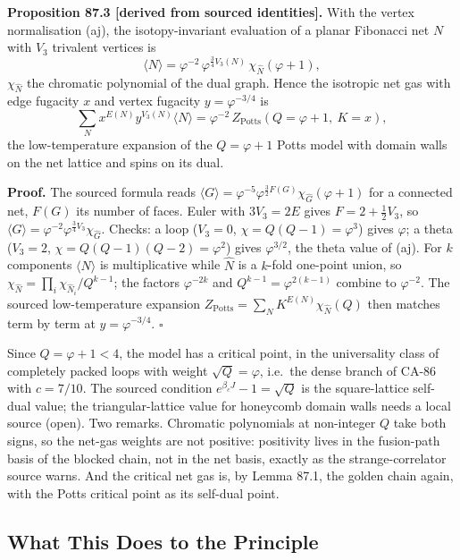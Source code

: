 \textbf{Proposition 87.3 [derived from sourced identities].}  With the
vertex normalisation (aj), the isotopy-invariant evaluation of a planar
Fibonacci net \(N\) with \(V_3\) trivalent vertices is
\[
  \langle N\rangle=\varphi^{-2}\,\varphi^{\frac34V_3(N)}\,\chi_{\widehat N}(\varphi+1),
\]
\(\chi_{\widehat N}\) the chromatic polynomial of the dual graph.  Hence the
isotropic net gas with edge fugacity \(x\) and vertex fugacity
\(y=\varphi^{-3/4}\) is
\[
  \sum_N x^{E(N)}y^{V_3(N)}\langle N\rangle=\varphi^{-2}\,Z_{\mathrm{Potts}}(Q=\varphi+1,\ K=x),
\]
the low-temperature expansion of the \(Q=\varphi+1\) Potts model with domain
walls on the net lattice and spins on its dual.

\textbf{Proof.}  The sourced formula reads \(\langle G\rangle=\varphi^{-5}\varphi^{\frac32F(G)}\chi_{\widehat G}(\varphi+1)\)
for a connected net, \(F(G)\) its number of faces.  Euler with \(3V_3=2E\)
gives \(F=2+\tfrac12V_3\), so \(\langle G\rangle=\varphi^{-2}\varphi^{\frac34V_3}\chi_{\widehat G}\).
Checks: a loop (\(V_3=0\), \(\chi=Q(Q-1)=\varphi^3\)) gives \(\varphi\); a
theta (\(V_3=2\), \(\chi=Q(Q-1)(Q-2)=\varphi^2\)) gives \(\varphi^{3/2}\),
the theta value of (aj).  For \(k\) components \(\langle N\rangle\) is
multiplicative while \(\widehat N\) is a \(k\)-fold one-point union, so
\(\chi_{\widehat N}=\prod_i\chi_{\widehat N_i}/Q^{k-1}\); the factors
\(\varphi^{-2k}\) and \(Q^{k-1}=\varphi^{2(k-1)}\) combine to \(\varphi^{-2}\).
The sourced low-temperature expansion \(Z_{\mathrm{Potts}}=\sum_NK^{E(N)}\chi_{\widehat N}(Q)\)
then matches term by term at \(y=\varphi^{-3/4}\).  \(\square\)

Since \(Q=\varphi+1<4\), the model has a critical point, in the universality
class of completely packed loops with weight \(\sqrt Q=\varphi\), i.e.\ the
dense branch of CA-86 with \(c=7/10\).  The sourced condition
\(e^{\beta_cJ}-1=\sqrt Q\) is the square-lattice self-dual value; the
triangular-lattice value for honeycomb domain walls needs a local source
(open).  Two remarks.  Chromatic polynomials at non-integer \(Q\) take both
signs, so the net-gas weights are not positive: positivity lives in the
fusion-path basis of the blocked chain, not in the net basis, exactly as the
strange-correlator source warns.  And the critical net gas is, by Lemma 87.1,
the golden chain again, with the Potts critical point as its self-dual point.

\subsection{What This Does to the Principle}

